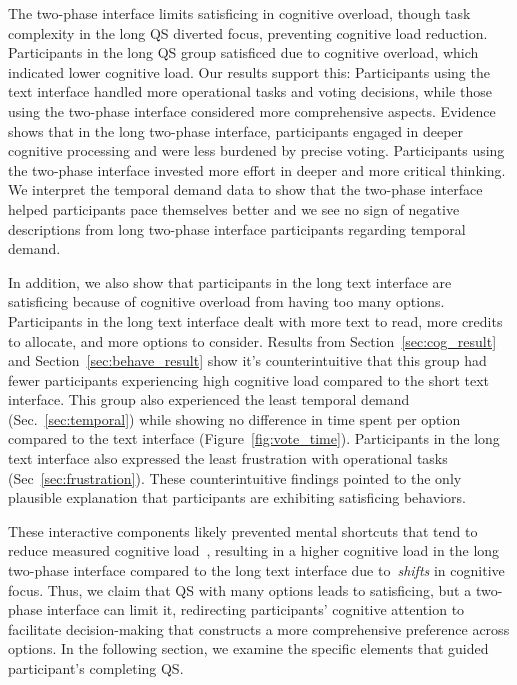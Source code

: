 The two-phase interface limits satisficing in cognitive overload, though task complexity in the long QS diverted focus, preventing cognitive load reduction. Participants in the long QS group satisficed due to cognitive overload, which indicated lower cognitive load. Our results support this: Participants using the text interface handled more operational tasks and voting decisions, while those using the two-phase interface considered more comprehensive aspects. Evidence shows that in the long two-phase interface, participants engaged in deeper cognitive processing and were less burdened by precise voting. Participants using the two-phase interface invested more effort in deeper and more critical thinking. We interpret the temporal demand data to show that the two-phase interface helped participants pace themselves better and we see no sign of negative descriptions from long two-phase interface participants regarding temporal demand.

In addition, we also show that participants in the long text interface are satisficing because of cognitive overload from having too many options. Participants in the long text interface dealt with more text to read, more credits to allocate, and more options to consider. Results from Section~\ref{sec:cog_result} and Section~\ref{sec:behave_result} show it's counterintuitive that this group had fewer participants experiencing high cognitive load compared to the short text interface. This group also experienced the least temporal demand (Sec.~\ref{sec:temporal}) while showing no difference in time spent per option compared to the text interface (Figure~\ref{fig:vote_time}). Participants in the long text interface also expressed the least frustration with operational tasks (Sec~\ref{sec:frustration}). These counterintuitive findings pointed to the only plausible explanation that participants are exhibiting satisficing behaviors. 

These interactive components likely prevented mental shortcuts that tend to reduce measured cognitive load~\cite{daniel2017thinking, simonBehavioralModelRational1955, payneAdaptiveStrategySelection1988, tverskyJudgmentsRepresentativeness}, resulting in a higher cognitive load in the long two-phase interface compared to the long text interface due to~\textit{shifts} in cognitive focus. Thus, we claim that QS with many options leads to satisficing, but a two-phase interface can limit it, redirecting participants' cognitive attention to facilitate decision-making that constructs a more comprehensive preference across options. In the following section, we examine the specific elements that guided participant's completing QS.


